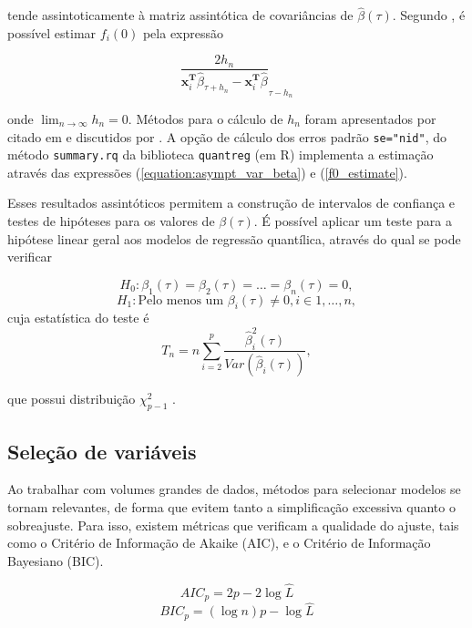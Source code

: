 \noindent tende assintoticamente à matriz assintótica de covariâncias de $\hat{\beta}(\tau)$. Segundo , é possível estimar $f_i(0)$ pela expressão

\begin{equation}
\frac{2h_n}{
    \mathbf{x}_i ^ \mathbf{T} \hat{\beta}_{\tau+h_{n}}-\mathbf{x} ^ \mathbf{T}_i\hat{\beta}}_{\tau-h_{n}}   
\label{f0_estimate}
\end{equation}

\noindent onde $\lim_{n\to\infty}h_n = 0$. Métodos para o cálculo de $h_n$ foram apresentados por  citado em  e discutidos por . A opção de cálculo dos erros padrão \texttt{se="nid"}, do método \texttt{summary.rq} da biblioteca \texttt{quantreg} (em R) implementa a estimação através das expressões (\ref{equation:asympt_var_beta}) e (\ref{f0_estimate}).

Esses resultados assintóticos permitem a construção de intervalos de confiança e testes de hipóteses para os valores de $\beta(\tau)$. É possível aplicar um teste  para a hipótese linear geral aos modelos de regressão quantílica, através do qual se pode verificar

$$H_0: \beta_1(\tau) = \beta_2(\tau) = \dots = \beta_n(\tau) = 0,$$
$$H_1: \text{Pelo menos um } \beta_i(\tau) \neq 0, i \in {1, \dots, n},$$
\noindent cuja estatística do teste é
\begin{equation}
    T_n = n\displaystyle \sum_{i=2}^p \frac{\hat{\beta}_i^2(\tau)}{Var(\hat{\beta}_i(\tau))},
\end{equation}

\noindent que possui distribuição $\chi^2_{p-1}$ \cite{brunoramodossantos}.

\subsection{Seleção de variáveis}
Ao trabalhar com volumes grandes de dados, métodos para selecionar modelos se tornam relevantes, de forma que evitem tanto a simplificação excessiva quanto o sobreajuste. Para isso, existem métricas que verificam a qualidade do ajuste, tais como o Critério de Informação de Akaike (AIC), e o Critério de Informação Bayesiano (BIC).

\begin{equation}
AIC_p = 2p - 2 \log \hat{L} 
\end{equation}
\begin{equation}
    BIC_p = (\log n)p - \log \hat{L}
\end{equation}

